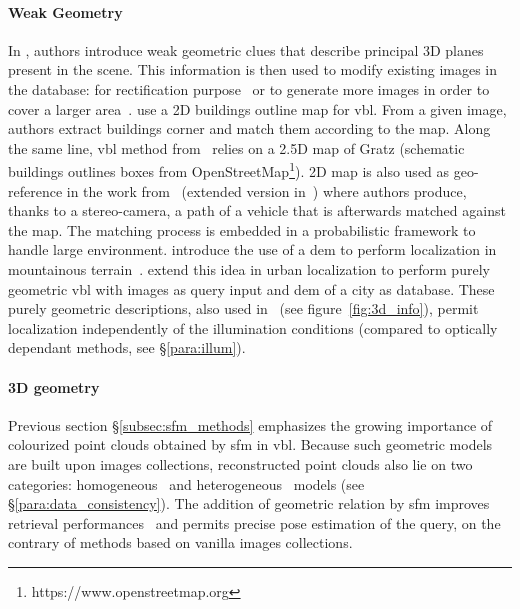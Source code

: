 		\paragraph{Weak Geometry}
			\label{subsubsec:weak_geometry}			
			In \citep{Torii2015,Chen2011}, authors introduce weak geometric clues that describe principal 3D planes present in the scene. This information is then used to modify existing images in the database: for rectification purpose~\citep{Chen2011} or to generate more images in order to cover a larger area~\citep{Torii2015}. \citet{Cham2010} use a 2D buildings outline map for \ac{vbl}. From a given image, authors extract buildings corner and match them according to the map. Along the same line, \ac{vbl} method from~\citep{Arth2015} relies on a 2.5D map of Gratz (schematic buildings outlines boxes from OpenStreetMap\footnote{https://www.openstreetmap.org}). 2D map is also used as geo-reference in the work from~\citep{Brubaker2013} (extended version in~\citep{Brubaker2016}) where authors produce, thanks to a stereo-camera, a path of a vehicle that is afterwards matched against the map. The matching process is embedded in a probabilistic framework to handle large environment. \citet{Baatz2012} introduce the use of a \ac{dem} to perform localization in mountainous terrain~\citep{Ramalingam2010,Tzeng2013,Chen2015}. \citet{Bansal2014} extend this idea in urban localization to perform purely geometric \ac{vbl} with images as query input and \ac{dem} of a city as database. These purely geometric descriptions, also used in~\citep{Matei2013,Christie2016,Ramalingam2010,Ramalingam2011} (see figure~\ref{fig:3d_info}), permit localization independently of the illumination conditions (compared to optically dependant methods, see \S\ref{para:illum}).

		\paragraph{3D geometry}
        \label{subsubsec:3d_geometry}
			Previous section \S\ref{subsec:sfm_methods} emphasizes the growing importance of colourized point clouds obtained by \ac{sfm} in \ac{vbl}. Because such geometric models are built upon images collections, reconstructed point clouds also lie on two categories: homogeneous~\citep{Kendall2015,Kendall2016} and heterogeneous~\citep{Irschara2009,Sattler2011} models (see \S\ref{para:data_consistency}). The addition of geometric relation by \ac{sfm} improves retrieval performances~\citep{Sattler2012a} and permits precise pose estimation of the query, on the contrary of methods based on vanilla images collections.

